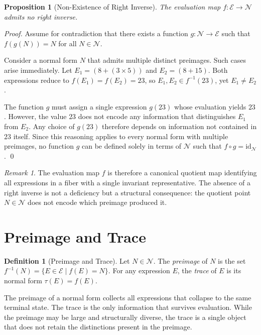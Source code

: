 \documentclass[12pt, oneside]{amsbook}
\theoremstyle{plain}
\newtheorem{proposition}[theorem]{Proposition}
\theoremstyle{definition}
\newtheorem{definition}[theorem]{Definition}
\theoremstyle{remark}
\newtheorem{remark}[theorem]{Remark}
\newcommand{\Expr}{\mathcal{E}}
\newcommand{\NF}{\mathcal{N}}
\newcommand{\evalf}{f}
\newcommand{\trace}{\tau}
\newcommand{\preimgset}[1]{f^{-1}(#1)}
\begin{document}
\begin{proposition}[Non-Existence of Right Inverse]
\label{prop:no-right-inverse}
The evaluation map $\evalf : \Expr \to \NF$ admits no right inverse.
\end{proposition}

\begin{proof}
Assume for contradiction that there exists a function $g : \NF \to \Expr$ such
that $\evalf(g(N)) = N$ for all $N \in \NF$.

Consider a normal form $N$ that admits multiple distinct preimages. Such cases
arise immediately. Let $E_1 = (8 + (3 \times 5))$ and $E_2 = (8 + 15)$. Both
expressions reduce to $\evalf(E_1) = \evalf(E_2) = 23$, so $E_1, E_2 \in
\preimgset{23}$, yet $E_1 \neq E_2$.

The function $g$ must assign a single expression $g(23)$ whose evaluation
yields $23$. However, the value $23$ does not encode any information that
distinguishes $E_1$ from $E_2$. Any choice of $g(23)$ therefore depends on
information not contained in $23$ itself. Since this reasoning applies to every
normal form with multiple preimages, no function $g$ can be defined solely in
terms of $\NF$ such that $\evalf \circ g = \mathrm{id}_{\NF}$.
\qed
\end{proof}

\begin{remark}
The evaluation map $\evalf$ is therefore a canonical quotient map identifying
all expressions in a fiber with a single invariant representative. The absence
of a right inverse is not a deficiency but a structural consequence: the
quotient point $N \in \NF$ does not encode which preimage produced it.
\end{remark}

\section{Preimage and Trace}
\label{sec:collapse:preimage}

\begin{definition}[Preimage and Trace]
\label{def:preimage-trace}
Let $N \in \NF$. The \emph{preimage} of $N$ is the set
$\preimgset{N} = \{ E \in \Expr \mid \evalf(E) = N \}$.
For any expression $E$, the \emph{trace} of $E$ is its normal form
$\trace(E) = \evalf(E)$.
\end{definition}

The preimage of a normal form collects all expressions that collapse to the
same terminal state. The trace is the only information that survives evaluation.
While the preimage may be large and structurally diverse, the trace is a single
object that does not retain the distinctions present in the preimage.
\end{document}
